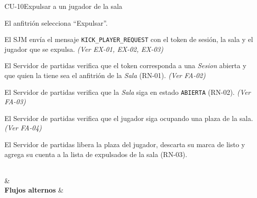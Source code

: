 \begin{fichacu}{CU-10}{Expulsar a un jugador de la sala}
{\begin{cuenum}[start=1]
      \item El anfitrión selecciona ``Expulsar''.
      \item El SJM envía el mensaje \texttt{KICK\_\allowbreak{}PLAYER\_\allowbreak{}REQUEST} con el token de sesión, la sala y el jugador que se expulsa. \textit{(Ver \mbox{EX-01}, \mbox{EX-02}, \mbox{EX-03})}
      \item El Servidor de partidas verifica que el token corresponda a una \textit{Sesion} abierta y que quien la tiene sea el anfitrión de la \textit{Sala} (\mbox{RN-01}). \textit{(Ver \mbox{FA-02})}
      \item El Servidor de partidas verifica que la \textit{Sala} siga en estado \texttt{ABIERTA} (\mbox{RN-02}). \textit{(Ver \mbox{FA-03})}
      \item El Servidor de partidas verifica que el jugador siga ocupando una plaza de la sala. \textit{(Ver \mbox{FA-04})}
      \item El Servidor de partidas libera la plaza del jugador, descarta su marca de listo y agrega su cuenta a la lista de expulsados de la sala (\mbox{RN-03}).
    \end{cuenum}} \\
   &  \\ \hline
  \textbf{Flujos alternos} & 
\end{fichacu}
